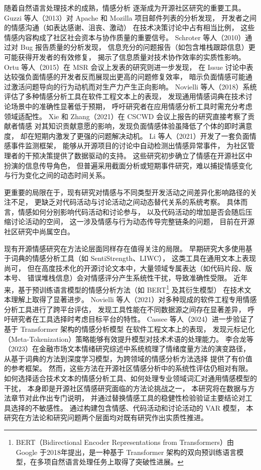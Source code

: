 \documentclass[
    type = master, %
    degree = professional,        %
    decl-page,  %
    twoside,                %
    fontset = fandol %
  ]{njuthesis}
\begin{document}
随着自然语言处理技术的成熟，情感分析
逐渐成为开源社区研究的重要工具。
Guzzi 等人（2013）对 Apache 和 Mozilla 项目邮件列表的分析发现，
开发者之间的情感沟通（如表达感谢、沮丧、激动）
在技术决策讨论中占有相当比例，
这些情感内容构成了社区社会资本与协作质量的重要信号\cite{guzzi2013}。
Schroter 等人（2010）通过对 Bug 报告质量的分析发现，
信息充分的问题报告（如包含堆栈跟踪信息）更可能获得开发者的有效修复，
揭示了信息质量对技术协作效率的实质性影响\cite{schroter2010}。
Ortu 等人（2015）在 MSR 会议上发表的研究则进一步发现，
在 Issue 讨论中表达较强负面情感的开发者反而展现出更高的问题修复效率，
暗示负面情感可能通过激活问题导向的行为动机而对生产力产生正向影响\cite{ortu2015bullies}。
Novielli 等人（2018）系统评估了多种情感分析工具在软件工程文本上的表现，
发现通用情感词典在技术讨论场景中的准确性显著低于预期，
呼吁研究者在应用情感分析工具时需充分考虑领域适配性\cite{novielli2018sentiment}。
Xie 和 Zhang（2021）在 CSCWD 会议上报告的研究直接考察了贡献者情感
对其知识贡献意愿的影响，发现负面情感体验虽降低了个体的即时满意度，
却在短期内激发了更强的问题解决动机\cite{xie2021influence}。
Li 等人（2021）开发了一套负面情感事件监测框架，
能够从开源项目的讨论中自动检测出情感异常事件，
为社区管理者的干预决策提供了数据驱动的支持\cite{li2021monitoring}。
这些研究初步确立了情感在开源社区中扮演的信息传导角色，
但普遍采用截面分析或短期事件研究，难以捕捉情感变化与行为变化之间的动态时间关系。

更重要的局限在于，现有研究对情感与不同类型开发活动之间差异化影响路径的关注不足，
更缺乏对代码活动与讨论活动之间动态替代关系的系统考察。
具体而言，情感如何分别影响代码活动和讨论参与，
以及代码活动的增加是否会随后压缩讨论活动的空间，
这一涉及情感与行为动态传导完整链条的问题，
目前在开源社区研究中尚属空白。

现有开源情感研究在方法论层面同样存在值得关注的局限。
早期研究大多使用基于词典的情感分析工具（如 SentiStrength、LIWC），
这类工具在通用文本上表现尚可，
但在高度技术化的开源讨论文本中，大量领域专属表达（如代码片段、版本号、
错误堆栈信息）会对情感评分产生系统性干扰，导致准确性受限。
近年来，基于预训练语言模型的情感分析方法（如 BERT\footnote{BERT（Bidirectional Encoder Representations from Transformers）由 Google 于2018年提出，是一种基于 Transformer 架构的双向预训练语言模型，在多项自然语言处理任务上取得了突破性进展。} 及其衍生模型）
在技术文本理解上取得了显著进步。
Novielli 等人（2021）对多种现成的软件工程专用情感分析工具进行了跨平台评估，
发现工具性能在不同数据源之间存在显著差异，
呼吁研究者在工具选择时考虑目标平台的特性\cite{novielli2021assessment}。
Cassee 等人（2024）进一步验证了基于 Transformer 架构的情感分析模型
在软件工程文本上的表现，
发现元标记化（Meta-Tokenization）策略能够有效提升模型对技术术语的处理能力\cite{cassee2024transformers}。
李合龙等（2023）在金融市场文本情绪研究综述中系统梳理了情绪度量方法的演变路径，
从基于词典的方法到深度学习模型，为跨领域的情感分析方法选择
提供了有价值的参考框架\cite{li2023sentiment}。
然而，这些方法在开源社区情感分析中的系统性评估仍相对有限。
如何选择适合技术文本的情感分析工具、如何处理专业领域词汇对通用情感模型的干扰，
本身即是开源社区情感研究面临的方法论挑战之一，
本研究将在数据与方法章节对此作出专门说明，
并通过替换情感工具的稳健性检验验证主要结论对工具选择的不敏感性。
通过构建包含情感、代码活动和讨论活动的 VAR 模型，
本研究在方法论和研究问题两个层面均对既有研究作出实质性推进。
\end{document}

